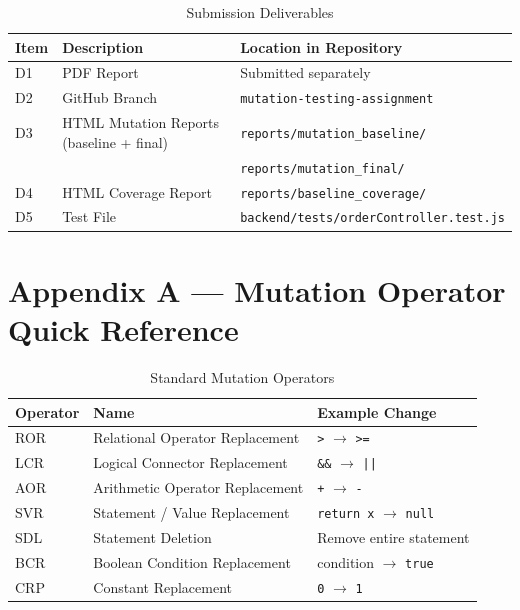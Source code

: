 \documentclass[12pt, a4paper]{article}
\begin{document}
\begin{table}[h!]
\centering
\begin{tabular}{lll}
\toprule
\textbf{Item} & \textbf{Description}                                         & \textbf{Location in Repository} \\
\midrule
D1 & PDF Report                                                         & Submitted separately            \\
D2 & GitHub Branch                                                      & \texttt{mutation-testing-assignment} \\
D3 & HTML Mutation Reports (baseline + final)                           & \texttt{reports/mutation\_baseline/} \\
   &                                                                    & \texttt{reports/mutation\_final/}    \\
D4 & HTML Coverage Report                                               & \texttt{reports/baseline\_coverage/} \\
D5 & Test File                                                          & \texttt{backend/tests/orderController.test.js} \\
\bottomrule
\end{tabular}
\caption{Submission Deliverables}
\end{table}

\appendix
\section{Appendix A --- Mutation Operator Quick Reference}

\begin{table}[h!]
\centering
\begin{tabular}{lll}
\toprule
\textbf{Operator} & \textbf{Name}                     & \textbf{Example Change}              \\
\midrule
ROR & Relational Operator Replacement           & \texttt{>} $\to$ \texttt{>=}         \\
LCR & Logical Connector Replacement             & \texttt{\&\&} $\to$ \texttt{||}      \\
AOR & Arithmetic Operator Replacement           & \texttt{+} $\to$ \texttt{-}          \\
SVR & Statement / Value Replacement             & \texttt{return x} $\to$ \texttt{null}\\
SDL & Statement Deletion                        & Remove entire statement              \\
BCR & Boolean Condition Replacement             & condition $\to$ \texttt{true}        \\
CRP & Constant Replacement                      & \texttt{0} $\to$ \texttt{1}          \\
\bottomrule
\end{tabular}
\caption{Standard Mutation Operators}
\end{table}
\end{document}
